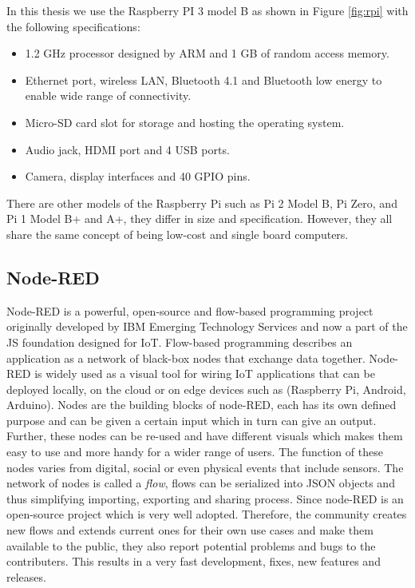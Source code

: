 \noindent In this thesis we use the Raspberry PI 3 model B as shown in Figure \ref{fig:rpi} with the following specifications:
\begin{itemize}
	\item 1.2 GHz processor designed by ARM and 1 GB of random access memory.
	\item Ethernet port, wireless LAN, Bluetooth 4.1 and Bluetooth low energy to enable wide range of connectivity.
	\item Micro-SD card slot for storage and hosting the operating system.
	\item Audio jack, HDMI port and 4 USB ports.
	\item Camera, display interfaces and 40 GPIO pins.
\end{itemize}

\noindent There are other models of the Raspberry Pi such as  Pi 2 Model B,  Pi Zero, and  Pi 1 Model B+ and A+, they differ in size and specification. However, they all share the same concept of being low-cost and single board computers.



\subsection{Node-RED}
Node-RED \cite{NODE-RED} is a powerful, open-source and flow-based programming project originally developed by IBM Emerging Technology Services and now a part of the JS foundation designed for IoT. Flow-based programming describes an application as a network of black-box nodes that exchange data together.  Node-RED is widely used as a visual tool for wiring IoT applications that can be deployed locally, on the cloud or on edge devices such as (Raspberry Pi, Android, Arduino). Nodes are the building blocks of node-RED, each has its own defined purpose and can be given a certain input which in turn can give an output. Further, these nodes can be re-used and  have different visuals which makes them easy to use and more handy for a wider range of users. The function of these nodes varies from digital, social  or even physical events that include sensors. The network of nodes is called a  \textit{flow}, flows can be  serialized into JSON objects and thus simplifying  importing, exporting and sharing process. Since node-RED is an open-source project which is very well adopted. Therefore, the community creates new flows and extends current ones for their own use cases and make them available to the public, they also  report potential problems and bugs to the contributers. This results in a very fast development, fixes, new features and releases.\\

